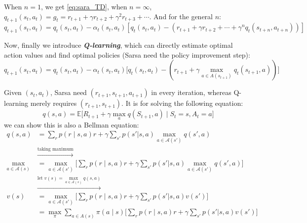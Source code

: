\documentclass[10pt]{elegantbook}
\newcommand{\mydefination}[1]{\textbf{\textit{\textcolor{structurecolor}{#1}}}}
\begin{document}
When $n=1$, we get \ref{eq:sara_TD}, when $n=\infty$, $q_{t+1}(s_t, a_t) = g_t = r_{t+1} + \gamma r_{t+2} + \gamma^2 r_{t+3} + \cdots$.
And for the general $n$:
\[
    q_{t+1}(s_t, a_t) = q_t(s_t, a_t) - \alpha_t(s_t, a_t) [q_t(s_t, a_t) - (r_{t+1} + \gamma r_{t+2} + \cdots + \gamma^n q_t(s_{t+n}, a_{t+n}))]
\]

Now, finally we introduce \mydefination{Q-learning}, which can directly estimate optimal action values and find
optimal policies (Sarsa need the policy improvement step):
\begin{equation} \label{eq:q_learning}
    q_{t+1}(s_t, a_t) = q_t(s_t, a_t) - \alpha_t(s_t, a_t) \big [ q_t(s_t, a_t) - (r_{t+1} + \gamma \max_{a \in A(s_{t+1})} q_t(s_{t+1}, a)) \big ]
\end{equation}

Given $(s_t, a_t)$, Sarsa need $(r_{t+1}, s_{t+1}, a_{t+1})$ in every iteration, whereas Q-learning merely requires $(r_{t+1}, s_{t+1})$.
It is for solving the following equation:
\begin{equation}
    q(s, a) = \mathbb E \big [ R_{t+1} + \gamma \max_a q(S_{t+1}, a) \mid S_t = s, A_t = a \big ]
\end{equation}
we can show this is also a Bellman equation:
\begin{align*}
    q(s, a) &= \sum_r p(r \mid s, a)r + \gamma \sum_{s'}p(s' | s, a) \max_{a \in \mathcal A(s')} q(s', a) \\
    & \xrightarrow{\text{taking maximum}} \\
    \max_{a \in \mathcal A(s)} & = \max_{a \in \mathcal A(s')} \big [ \sum_r p(r \mid s, a)r + \gamma \sum_{s'}p(s' | s, a) \max_{a \in \mathcal A(s')} q(s', a) \big ] \\
    & \xrightarrow{\text{let } v(s) = \max_{a \in \mathcal A(s)} q(s, a)} \\
    v(s) &= \max_{a \in \mathcal A(s')} \big [ \sum_r p(r \mid s, a)r + \gamma \sum_{s'}p(s' | s, a) v(s') \big ] \\
            &= \max_{\pi} \sum_{a \in A(s)} \pi(a \mid s) \big [ \sum_r p(r \mid s, a)r + \gamma \sum_{s'}p(s' | s, a) v(s') \big ]
\end{align*}
\end{document}
